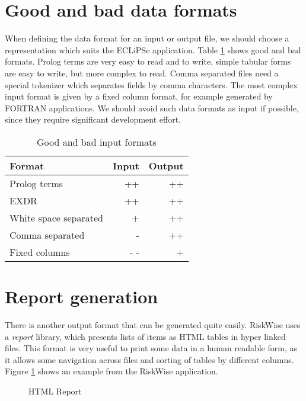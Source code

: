 \documentclass[a4paper,12pt]{report}
\begin{document}
\section{Good and bad data formats}
When defining the data format for an input or output file, we should choose a representation which suits the ECLiPSe application. Table \ref{InputFormats} shows good and bad formats. Prolog terms are very easy to read and to write, simple tabular forms are easy to write, but more complex to read. Comma separated files need a special tokenizer which separates fields by comma characters. The most complex input format is given by a fixed column format, for example generated by FORTRAN applications. We should avoid such data formats as input if possible, since they require significant development effort.
\begin{table}[htbp]
\begin{tabular}{|l|r|r|}
\hline
Format & Input & Output \\ \hline
Prolog terms & ++ & ++ \\ \hline
EXDR & ++ & ++ \\ \hline
White space separated & + & ++ \\ \hline
Comma separated & - & ++ \\ \hline
Fixed columns & - - & + \\ \hline
\end{tabular}
\caption{\label{InputFormats}Good and bad input formats}
\end{table}

\section{Report generation}
There is another output format that can be generated quite easily. RiskWise uses a {\it report} library, which presents lists of items as HTML tables in hyper linked files. This format is very useful to print some data in a human readable form, as it allows some navigation across files and sorting of tables by different columns. Figure \ref{HTMLReport} shows an example from the RiskWise application.

\begin{figure}[thbp]
\caption{\label{HTMLReport}HTML Report}
\end{figure}

\end{document}
